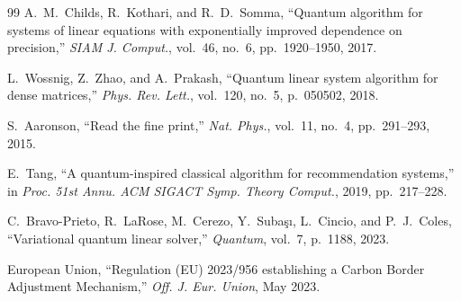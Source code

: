 \documentclass[letterpaper, 10 pt, conference]{ieeeconf}
\begin{document}
\begin{thebibliography}{99}
A.~M.~Childs, R.~Kothari, and R.~D.~Somma, ``Quantum algorithm for systems of linear equations with exponentially improved dependence on precision,'' \textit{SIAM J. Comput.}, vol.~46, no.~6, pp.~1920--1950, 2017.

L.~Wossnig, Z.~Zhao, and A.~Prakash, ``Quantum linear system algorithm for dense matrices,'' \textit{Phys. Rev. Lett.}, vol.~120, no.~5, p.~050502, 2018.

S.~Aaronson, ``Read the fine print,'' \textit{Nat. Phys.}, vol.~11, no.~4, pp.~291--293, 2015.

E.~Tang, ``A quantum-inspired classical algorithm for recommendation systems,'' in \textit{Proc. 51st Annu. ACM SIGACT Symp. Theory Comput.}, 2019, pp.~217--228.

C.~Bravo-Prieto, R.~LaRose, M.~Cerezo, Y.~Subaşı, L.~Cincio, and P.~J.~Coles, ``Variational quantum linear solver,'' \textit{Quantum}, vol.~7, p.~1188, 2023.

European Union, ``Regulation (EU) 2023/956 establishing a Carbon Border Adjustment Mechanism,'' \textit{Off. J. Eur. Union}, May 2023.

\end{thebibliography}
\end{document}
